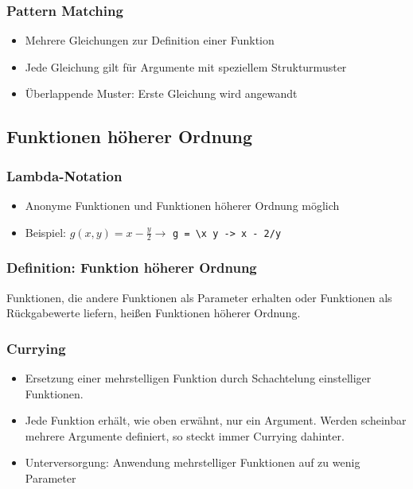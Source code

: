 \subsubsection{Pattern Matching}
\begin{itemize}
	\item Mehrere Gleichungen zur Definition einer Funktion
	\item Jede Gleichung gilt für Argumente mit speziellem Strukturmuster
	\item Überlappende Muster: Erste Gleichung wird angewandt
\end{itemize}


\subsection{Funktionen höherer Ordnung}

\subsubsection{Lambda-Notation}
\begin{itemize}
	\item Anonyme Funktionen und Funktionen höherer Ordnung möglich
	\item Beispiel: \(g(x,y)=x-\frac{y}{2} \longrightarrow\) \texttt{g = \textbackslash x y -> x - 2/y}
\end{itemize}

\subsubsection{Definition: Funktion höherer Ordnung}
Funktionen, die andere Funktionen als Parameter erhalten oder Funktionen als Rückgabewerte liefern, heißen Funktionen höherer Ordnung.

\subsubsection{Currying}
\begin{itemize}
	\item Ersetzung einer mehrstelligen Funktion durch Schachtelung einstelliger Funktionen.
	\item Jede Funktion erhält, wie oben erwähnt, nur ein Argument. Werden scheinbar mehrere Argumente definiert, so steckt immer Currying dahinter.
	\item Unterversorgung: Anwendung mehrstelliger Funktionen auf zu wenig Parameter
\end{itemize}

